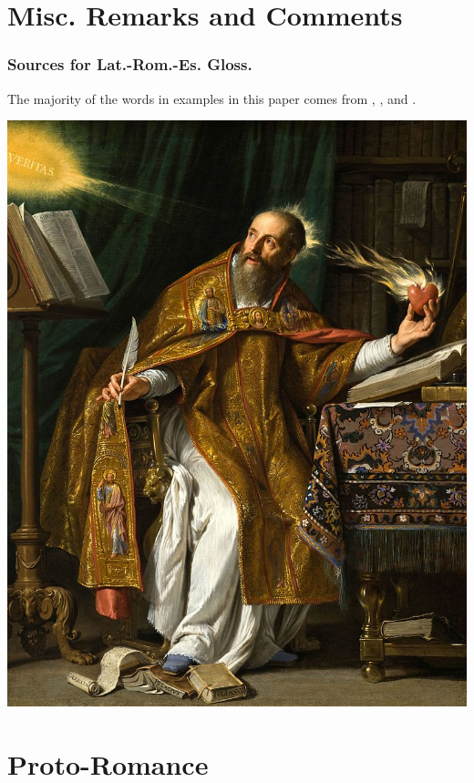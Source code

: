 \documentclass{report}[12pt]
\begin{document}
\chapter*{Misc. Remarks and Comments}

\subsection*{Sources for Lat.-Rom.-Es. Gloss.}

The majority of the words in examples in this paper comes from \cite{romance_his}, \cite{lloyd_spanish}, and \cite{penny_spanish}. 

\pagebreak

\includegraphics[scale=0.5]{augustine.jpg}

\thispagestyle{empty}

\pagebreak

\chapter{Proto-Romance}
\end{document}
